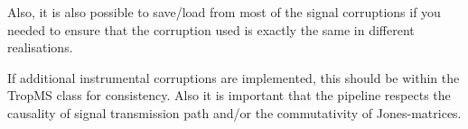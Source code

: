  Also, it is also possible to save/load from most of the signal corruptions if you needed to ensure that the corruption used is exactly the same in different realisations. 



If additional instrumental corruptions are implemented, this should be within the TropMS class for consistency. Also it is important that the pipeline respects the causality of signal transmission path and/or the commutativity of Jones-matrices.


















